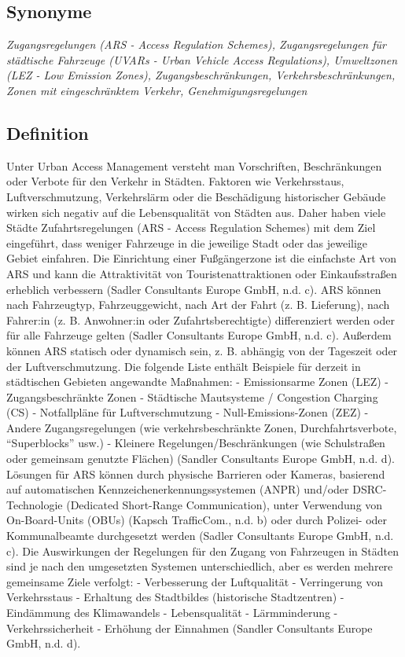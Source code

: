 \documentclass[
]{book}
\begin{document}
\hypertarget{synonyme-15}{%
\subsection*{Synonyme}\label{synonyme-15}}

\emph{Zugangsregelungen (ARS - Access Regulation Schemes), Zugangsregelungen für städtische Fahrzeuge (UVARs - Urban Vehicle Access Regulations), Umweltzonen (LEZ - Low Emission Zones), Zugangsbeschränkungen, Verkehrsbeschränkungen, Zonen mit eingeschränktem Verkehr, Genehmigungsregelungen}

\hypertarget{definition-17}{%
\subsection*{Definition}\label{definition-17}}

Unter Urban Access Management versteht man Vorschriften, Beschränkungen oder Verbote für den Verkehr in Städten. Faktoren wie Verkehrsstaus, Luftverschmutzung, Verkehrslärm oder die Beschädigung historischer Gebäude wirken sich negativ auf die Lebensqualität von Städten aus. Daher haben viele Städte Zufahrtsregelungen (ARS - Access Regulation Schemes) mit dem Ziel eingeführt, dass weniger Fahrzeuge in die jeweilige Stadt oder das jeweilige Gebiet einfahren. Die Einrichtung einer Fußgängerzone ist die einfachste Art von ARS und kann die Attraktivität von Touristenattraktionen oder Einkaufsstraßen erheblich verbessern (Sadler Consultants Europe GmbH, n.d. c). ARS können nach Fahrzeugtyp, Fahrzeuggewicht, nach Art der Fahrt (z. B. Lieferung), nach Fahrer:in (z. B. Anwohner:in oder Zufahrtsberechtigte) differenziert werden oder für alle Fahrzeuge gelten (Sadler Consultants Europe GmbH, n.d. c). Außerdem können ARS statisch oder dynamisch sein, z. B. abhängig von der Tageszeit oder der Luftverschmutzung. Die folgende Liste enthält Beispiele für derzeit in städtischen Gebieten angewandte Maßnahmen:
- Emissionsarme Zonen (LEZ)
- Zugangsbeschränkte Zonen
- Städtische Mautsysteme / Congestion Charging (CS)
- Notfallpläne für Luftverschmutzung
- Null-Emissions-Zonen (ZEZ)
- Andere Zugangsregelungen (wie verkehrsbeschränkte Zonen, Durchfahrtsverbote, ``Superblocks'' usw.)
- Kleinere Regelungen/Beschränkungen (wie Schulstraßen oder gemeinsam genutzte Flächen) (Sandler Consultants Europe GmbH, n.d. d).
Lösungen für ARS können durch physische Barrieren oder Kameras, basierend auf automatischen Kennzeichenerkennungssystemen (ANPR) und/oder DSRC-Technologie (Dedicated Short-Range Communication), unter Verwendung von On-Board-Units (OBUs) (Kapsch TrafficCom., n.d. b) oder durch Polizei- oder Kommunalbeamte durchgesetzt werden (Sadler Consultants Europe GmbH, n.d. c).
Die Auswirkungen der Regelungen für den Zugang von Fahrzeugen in Städten sind je nach den umgesetzten Systemen unterschiedlich, aber es werden mehrere gemeinsame Ziele verfolgt: - Verbesserung der Luftqualität - Verringerung von Verkehrsstaus - Erhaltung des Stadtbildes (historische Stadtzentren) - Eindämmung des Klimawandels - Lebensqualität - Lärmminderung - Verkehrssicherheit - Erhöhung der Einnahmen (Sandler Consultants Europe GmbH, n.d. d).
\end{document}
